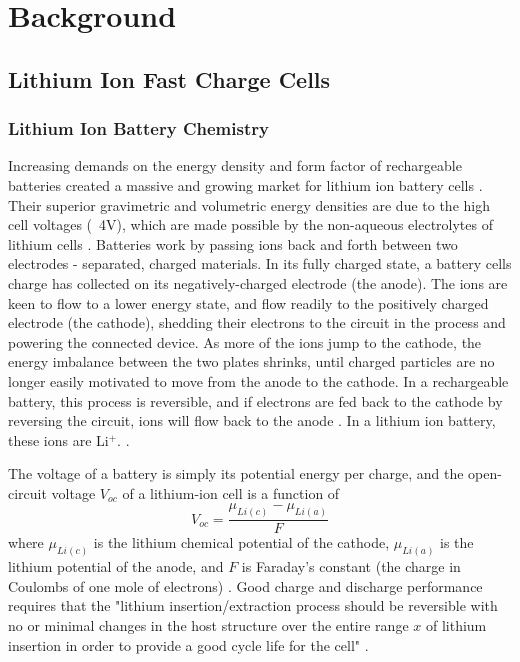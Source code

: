 \chapter{Background}

\section{Lithium Ion Fast Charge Cells}

\subsection{Lithium Ion Battery Chemistry}
Increasing demands on the energy density and form factor of rechargeable batteries created a massive and growing market for lithium ion battery cells \cite{LBST}. 
Their superior gravimetric and volumetric energy densities are due to the high cell voltages (~4V), which are made possible by the non-aqueous electrolytes of lithium cells \cite{LBST}. Batteries work by passing ions back and forth between two electrodes - separated, charged materials. In its fully charged state, a battery cells charge has collected on its negatively-charged electrode (the anode). 
The ions are keen to flow to a lower energy state, and flow readily to the positively charged electrode (the cathode), shedding their electrons to the circuit in the process and powering the connected device. 
As more of the ions jump to the cathode, the energy imbalance between the two plates shrinks, until charged particles are no longer easily motivated to move from the anode to the cathode. 
In a rechargeable battery, this process is reversible, and if electrons are fed back to the cathode by reversing the circuit, ions will flow back to the anode \cite{ LBST}. In a lithium ion battery, these ions are Li$^+$. .

The voltage of a battery is simply its potential energy per charge, and the open-circuit voltage $V_{oc}$ of a lithium-ion cell is a function of
$$ V_{oc} = \frac{\mu _{Li(c)} - \mu _{Li(a)}}{F} $$
where $\mu_{Li(c)}$ is the lithium chemical potential of the cathode, $\mu_{Li(a)}$ is the lithium potential of the anode, and $F$ is Faraday's constant (the charge in Coulombs of one mole of electrons) \cite{LBST}.
Good charge and discharge performance requires that the "lithium insertion/extraction process should be reversible with no or minimal changes in the host structure over the entire range $x$ of lithium insertion in order to provide a good cycle life for the cell" \cite{LBST}.

